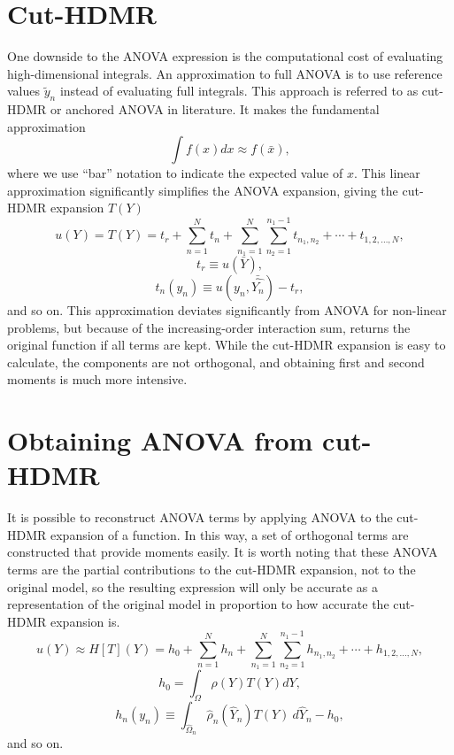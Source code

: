 \documentclass[11pt]{article}
\begin{document}
\section{Cut-HDMR}
One downside to the ANOVA expression is the computational cost of evaluating high-dimensional integrals.  An
approximation to full ANOVA is to use reference values $\tilde y_n$ instead of evaluating full integrals.
This approach is referred to as cut-HDMR or anchored ANOVA in literature.  It makes the fundamental
approximation
\begin{equation}
  \int f(x) dx \approx f(\bar x),
\end{equation}
where we use ``bar'' notation to indicate the expected value of $x$.  This linear approximation significantly
simplifies the ANOVA expansion, giving the cut-HDMR expansion $T(Y)$
\begin{equation}
  u(Y) = T(Y) = t_r + \sum_{n=1}^N t_n + \sum_{n_1=1}^N \sum_{n_2=1}^{n_1-1} t_{n_1,n_2} + \cdots +
  t_{1,2,\ldots,N},
\end{equation}
\begin{equation}
  t_r \equiv u(\bar Y),
\end{equation}
\begin{equation}
  t_n(y_n) \equiv u(y_n,\bar{\hat{ Y_n}}) - t_r,
\end{equation}
and so on.  This approximation deviates significantly from ANOVA for non-linear problems, but because of the
increasing-order interaction sum, returns the original function if all terms are kept.  While the cut-HDMR
expansion is easy to calculate, the components are not orthogonal, and obtaining first and second moments is
much more intensive.

\section{Obtaining ANOVA from cut-HDMR}
It is possible to reconstruct ANOVA terms by applying ANOVA to the cut-HDMR expansion of a function.  In this
way, a set of orthogonal terms are constructed that provide moments easily.  It is worth noting that these
ANOVA terms are the partial contributions to the cut-HDMR expansion, not to the original model, so the
resulting expression will only be accurate as a representation of the original model in proportion to how
accurate the cut-HDMR expansion is.
\begin{equation}
  u(Y) \approx H[T](Y) = h_0 + \sum_{n=1}^N h_n + \sum_{n_1=1}^N \sum_{n_2=1}^{n_1-1} h_{n_1,n_2} + \cdots +
  h_{1,2,\ldots,N},
\end{equation}
\begin{equation}
  h_0 = \int_\Omega \rho(Y) T(Y) dY,
\end{equation}
\begin{equation}
  h_n(y_n) \equiv \int_{\hat\Omega_n} \hat\rho_n(\hat Y_n) T(Y)\ d\hat Y_n - h_0,
\end{equation}
and so on.
\end{document}
